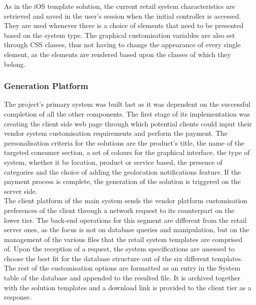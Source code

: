 As in the iOS template solution, the current retail system characteristics are retrieved and saved in the user's session when the initial controller is accessed. They are used whenever there is a choice of elements that need to be presented based on the system type. The graphical customisation variables are also set through CSS classes, thus not having to change the appearance of every single element, as the elements are rendered based upon the classes of which they belong.

\subsubsection{Generation Platform}

The project's primary system was built last as it was dependent on the successful completion of all the other components. The first stage of its implementation was creating the client side web page through which potential clients could input their vendor system customisation requirements and perform the payment. The personalisation criteria for the solutions are the product's title, the name of the targeted consumer section, a set of colours for the graphical interface, the type of system, whether it be location, product or service based, the presence of categories and the choice of adding the geolocation notifications feature. If the payment process is complete, the generation of the solution is triggered on the server side.\\

The client platform of the main system sends the vendor platform customisation preferences of the client through a network request to its counterpart on the lower tier. The back-end operations for this segment are different from the retail server ones, as the focus is not on database queries and manipulation, but on the management of the various files that the retail system templates are comprised of. Upon the reception of a request, the system specifications are assessed to choose the best fit for the database structure out of the six different templates. The rest of the customisation options are formatted as an entry in the System table of the database and appended to the resulted file. It is archived together with the solution templates and a download link is provided to the client tier as a response.\\

